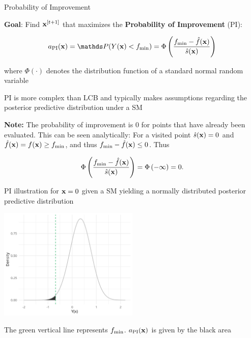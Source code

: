 \documentclass[11pt,compress,t,notes=noshow, xcolor=table]{beamer}
\begin{document}
\begin{vbframe}{Probability of Improvement}

\textbf{Goal}: Find $\mathbf{x}^{[t+1]}$ that maximizes the \textbf{Probability of Improvement} (PI):

$$
  a_{\text{PI}}(\xv) = \P(Y(\xv) < \fmin) = \Phi\left(\frac{\fmin - \fh(\xv)}{\sh(\xv)}\right)
$$

where $\Phi(\cdot)$ denotes the distribution function of a standard normal random variable\\

\vspace{1em}

PI is more complex than LCB and typically makes assumptions regarding the posterior predictive distribution under a SM

\vfill

\begin{footnotesize}
\textbf{Note:} The probability of improvement is $0$ for points that have already been evaluated. This can be seen analytically: For a visited point $\hat{s}(\mathbf{x}) = 0$ and $\hat{f}(\mathbf{x}) = f(\mathbf{x}) \ge f_{\min}$, and thus $f_{\min} - \hat{f}(\mathbf{x}) \le 0$. Thus

$$
  \Phi\left(\frac{f_{\min} - \hat{f}(\mathbf{x})}{\hat{s}(\mathbf{x})}\right) = \Phi\left(- \infty\right) = 0.
$$

\end{footnotesize}

\framebreak

PI illustration for $\mathbf{x} = 0$ given a SM yielding a normally distributed posterior predictive distribution

\begin{center}
  \includegraphics[width = 0.5\textwidth]{figure_man/bayesian_loop_pi_0.png}
\end{center}

\begin{footnotesize}
The green vertical line represents $f_{\min}$. $a_{\text{PI}}(\mathbf{x})$ is given by the black area
\end{footnotesize}


\end{vbframe}
\end{document}
